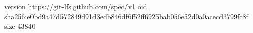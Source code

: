 version https://git-lfs.github.com/spec/v1
oid sha256:e0bd9a47d572849d91d3edb846df6f52ff6925bab056e52d0a0acecd3799fc8f
size 43840
